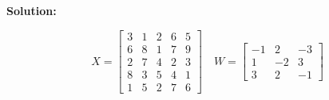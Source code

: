 \documentclass{article}
\newenvironment{solution}
  {\par\noindent\textbf{Solution:}\par}
  {\par}
\begin{document}
\subsection{}
\begin{solution}
  \[
    X = \begin{bmatrix}
       3 & 1 &2 &6 &5 \\ 
       6 & 8 & 1 & 7 & 9 \\ 
       2 & 7 & 4 & 2 & 3 \\ 
       8 & 3 & 5 & 4 & 1 \\ 
       1 & 5 & 2 & 7 & 6
    \end{bmatrix} \quad W = \begin{bmatrix}
       -1 & 2 & -3 \\ 
       1 & -2 & 3 \\ 
       3 & 2 & -1
    \end{bmatrix}
  \]


\end{solution}
\end{document}
